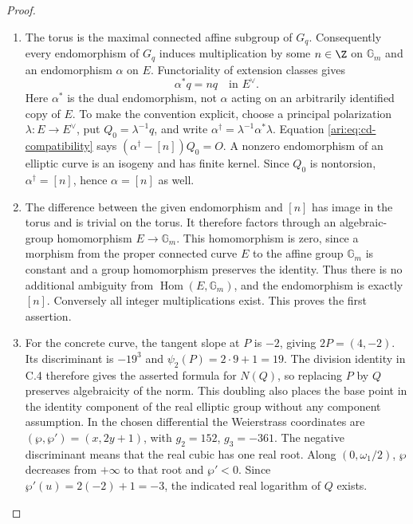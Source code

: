 \begin{proof}
\begin{enumerate}[label=\arabic*.,leftmargin=*]
\item The torus is the maximal connected affine subgroup of $G_q$.
Consequently every endomorphism of $G_q$ induces multiplication
by some $n\in\Z$ on $\mathbb G_m$ and an endomorphism
$\alpha$ on $E$. Functoriality of extension classes gives
\begin{equation}\label{ari:eq:cd-compatibility}
 \alpha^*q=nq\quad\text{in }E^\vee.
\end{equation}
Here $\alpha^*$ is the dual endomorphism, not $\alpha$
acting on an arbitrarily identified copy of $E$. To make the
convention explicit, choose a principal polarization
$\lambda:E\to E^\vee$, put $Q_0=\lambda^{-1}q$, and
write $\alpha^\dagger=\lambda^{-1}\alpha^*\lambda$.
Equation \eqref{ari:eq:cd-compatibility} says
$(\alpha^\dagger-[n])Q_0=O$. A nonzero endomorphism of an
elliptic curve is an isogeny and has finite kernel. Since
$Q_0$ is nontorsion, $\alpha^\dagger=[n]$, hence
$\alpha=[n]$ as well.

\item The difference between the given endomorphism and $[n]$ has
image in the torus and is trivial on the torus. It therefore
factors through an algebraic-group homomorphism
$E\to\mathbb G_m$. This homomorphism is zero, since a
morphism from the proper connected curve $E$ to the affine
group $\mathbb G_m$ is constant and a group homomorphism
preserves the identity. Thus there is no additional ambiguity
from $\operatorname{Hom}(E,\mathbb G_m)$, and the
endomorphism is exactly $[n]$. Conversely all integer
multiplications exist. This proves the first assertion.

\item For the concrete curve, the tangent slope at $P$ is $-2$,
giving $2P=(4,-2)$. Its discriminant is $-19^3$ and
$\psi_2(P)=2\cdot9+1=19$. The division identity in C.4
therefore gives the asserted formula for $N(Q)$, so replacing
$P$ by $Q$ preserves algebraicity of the norm. This doubling
also places the base point in the identity component of the
real elliptic group without any component assumption. In the
chosen differential the Weierstrass coordinates are
$(\wp,\wp')=(x,2y+1)$, with $g_2=152$, $g_3=-361$.
The negative discriminant means that the real cubic has one
real root. Along $(0,\omega_1/2)$, $\wp$ decreases from
$+\infty$ to that root and $\wp'<0$. Since
$\wp'(u)=2(-2)+1=-3$, the indicated real logarithm of $Q$
exists.


\end{enumerate}
\end{proof}
